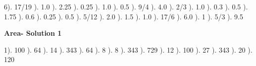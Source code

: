 \documentclass{article}%
\begin{document}
6). 17/19%
). 1.0%
). 2.25%
). 0.25%
). 1.0%
). 0.5%
). 9/4%
). 4.0%
). 2/3%
). 1.0%
). 0.3%
). 0.5%
). 1.75%
). 0.6%
). 0.25%
). 0.5%
). 5/12%
). 2.0%
). 1.5%
). 1.0%
). 17/6%
). 6.0%
). 1%
). 5/3%
). 9.5%
\newline%
\newpage%
\large%
\begin{center}%
\textbf{Area- Solution 1}%
\newline%
\end{center} \normalsize%
1). 100%
). 64%
). 14%
). 343%
). 64%
). 8%
). 8%
). 343%
). 729%
). 12%
). 100%
). 27%
). 343%
). 20%
). 120%
\newline%
\end{document}
